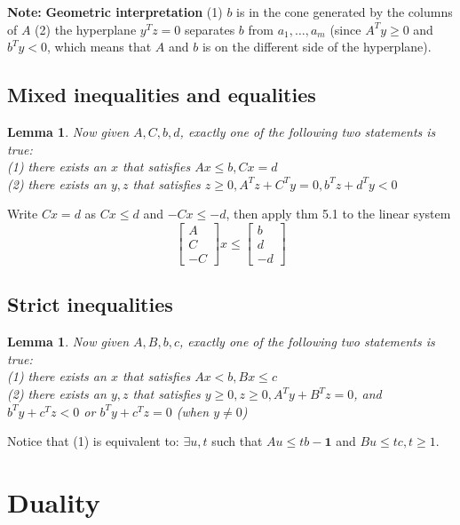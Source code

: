 \documentclass[10pt]{article}
\newtheorem{lemma}[thm]{Lemma}
\theoremstyle{definition}
\newcommand{\Note}[0]{\noindent\textbf{Note: }}
\begin{document}
\Note \textbf{Geometric interpretation} (1) $b$ is in the cone generated by the columns of $A$
(2) the hyperplane $y^T z = 0$ separates $b$ from $a_1,\dots , a_m$
(since $A^Ty \ge 0$ and $b^Ty < 0$, which means that $A$ and $b$ is on the different side of the hyperplane).

\subsection{Mixed inequalities and equalities}
\begin{lemma}
	Now given $A, C, b, d$, exactly one of the following two statements is true:\\
	(1) there exists an $x$ that satisfies $Ax \le b, Cx = d$\\
	(2) there exists an $y, z$ that satisfies $z \ge 0, A^Tz + C^Ty = 0, b^Tz + d^Ty < 0$
\end{lemma}
\proof Write $Cx = d$ as $Cx \le d$ and $-Cx \le -d$, then apply thm 5.1 to the linear system
\begin{equation*}
	\begin{bmatrix}
		A \\ C \\ -C
	\end{bmatrix} x \le
	\begin{bmatrix}
		b \\ d \\ -d
	\end{bmatrix}
\end{equation*}

\subsection{Strict inequalities}

\begin{lemma}
	Now given $A, B, b, c$, exactly one of the following two statements is true:\\
	(1) there exists an $x$ that satisfies $Ax < b, Bx \le c$\\
	(2) there exists an $y, z$ that satisfies $y \ge 0, z \ge 0, A^Ty + B^Tz = 0$,
	and $b^Ty + c^Tz < 0$ or $b^Ty + c^Tz = 0$ (when $y \neq 0$)
\end{lemma}
\proof Notice that (1) is equivalent to: $\exists u, t$ such that $Au \le tb - \textbf{1}$
and $Bu \le tc, t\ge 1$.


\section{Duality}
\end{document}
